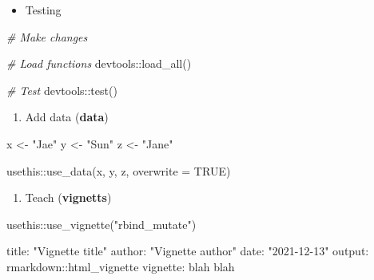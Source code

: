 \documentclass[
]{book}
\newenvironment{Shaded}{\begin{snugshade}}{\end{snugshade}}
\newcommand{\AttributeTok}[1]{\textcolor[rgb]{0.77,0.63,0.00}{#1}}
\newcommand{\CommentTok}[1]{\textcolor[rgb]{0.56,0.35,0.01}{\textit{#1}}}
\newcommand{\ConstantTok}[1]{\textcolor[rgb]{0.00,0.00,0.00}{#1}}
\newcommand{\FunctionTok}[1]{\textcolor[rgb]{0.00,0.00,0.00}{#1}}
\newcommand{\NormalTok}[1]{#1}
\newcommand{\OtherTok}[1]{\textcolor[rgb]{0.56,0.35,0.01}{#1}}
\newcommand{\SpecialCharTok}[1]{\textcolor[rgb]{0.00,0.00,0.00}{#1}}
\newcommand{\StringTok}[1]{\textcolor[rgb]{0.31,0.60,0.02}{#1}}
\providecommand{\tightlist}{%
  \setlength{\itemsep}{0pt}\setlength{\parskip}{0pt}}
\begin{document}
\begin{itemize}
\tightlist
\item
  Testing
\end{itemize}

\begin{Shaded}
\begin{Highlighting}[]
\CommentTok{\# Make changes }

\CommentTok{\# Load functions }
\NormalTok{devtools}\SpecialCharTok{::}\FunctionTok{load\_all}\NormalTok{()}

\CommentTok{\# Test }
\NormalTok{devtools}\SpecialCharTok{::}\FunctionTok{test}\NormalTok{()}
\end{Highlighting}
\end{Shaded}

\begin{enumerate}
\def\labelenumi{\arabic{enumi}.}
\setcounter{enumi}{1}
\tightlist
\item
  Add data (\textbf{data})
\end{enumerate}

\begin{Shaded}
\begin{Highlighting}[]
\NormalTok{x }\OtherTok{\textless{}{-}} \StringTok{"Jae"}
\NormalTok{y }\OtherTok{\textless{}{-}} \StringTok{"Sun"}
\NormalTok{z }\OtherTok{\textless{}{-}} \StringTok{"Jane"}

\NormalTok{usethis}\SpecialCharTok{::}\FunctionTok{use\_data}\NormalTok{(x, y, z, }\AttributeTok{overwrite =} \ConstantTok{TRUE}\NormalTok{)}
\end{Highlighting}
\end{Shaded}

\begin{enumerate}
\def\labelenumi{\arabic{enumi}.}
\setcounter{enumi}{2}
\tightlist
\item
  Teach (\textbf{vignetts})
\end{enumerate}

\begin{Shaded}
\begin{Highlighting}[]
\NormalTok{usethis}\SpecialCharTok{::}\FunctionTok{use\_vignette}\NormalTok{(}\StringTok{"rbind\_mutate"}\NormalTok{)}
\end{Highlighting}
\end{Shaded}

\begin{Shaded}
\begin{Highlighting}[]
\NormalTok{title}\SpecialCharTok{:} \StringTok{"Vignette title"}
\NormalTok{author}\SpecialCharTok{:} \StringTok{"Vignette author"}
\NormalTok{date}\SpecialCharTok{:} \StringTok{"2021{-}12{-}13"}
\NormalTok{output}\SpecialCharTok{:}\NormalTok{ rmarkdown}\SpecialCharTok{::}\NormalTok{html\_vignette}
\NormalTok{vignette}\SpecialCharTok{:}\NormalTok{ blah blah}
\end{Highlighting}
\end{Shaded}
\end{document}
